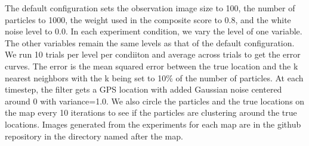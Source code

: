 \documentclass{article}
\begin{document}
The default configuration sets the observation image size to 100, the number of particles to 1000, the weight used in the composite score to 0.8, and the white noise level to 0.0. In each experiment condition, we vary the level of one variable. The other variables remain the same levels as that of the default configuration. We run 10 trials per level per condiiton and average across trials to get the error curves. The error is the mean squared error between the true location and the k nearest neighbors with the k being set to 10\% of the number of particles. At each timestep, the filter gets a GPS location with added Gaussian noise centered around 0 with variance=1.0. We also circle the particles and the true locations on the map every 10 iterations to see if the particles are clustering around the true locations. Images generated from the experiments for each map are in the github repository in the directory named after the map.
\end{document}
